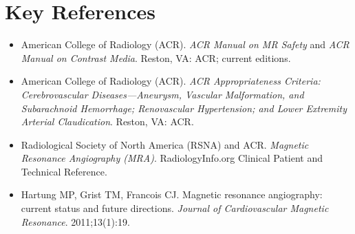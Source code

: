 \section{Key References}
\begin{itemize}
\item American College of Radiology (ACR). \textit{ACR Manual on MR Safety} and \textit{ACR Manual on Contrast Media}. Reston, VA: ACR; current editions.
\item American College of Radiology (ACR). \textit{ACR Appropriateness Criteria: Cerebrovascular Diseases---Aneurysm, Vascular Malformation, and Subarachnoid Hemorrhage; Renovascular Hypertension; and Lower Extremity Arterial Claudication}. Reston, VA: ACR.
\item Radiological Society of North America (RSNA) and ACR. \textit{Magnetic Resonance Angiography (MRA)}. RadiologyInfo.org Clinical Patient and Technical Reference.
\item Hartung MP, Grist TM, Francois CJ. Magnetic resonance angiography: current status and future directions. \textit{Journal of Cardiovascular Magnetic Resonance}. 2011;13(1):19.
\end{itemize}
